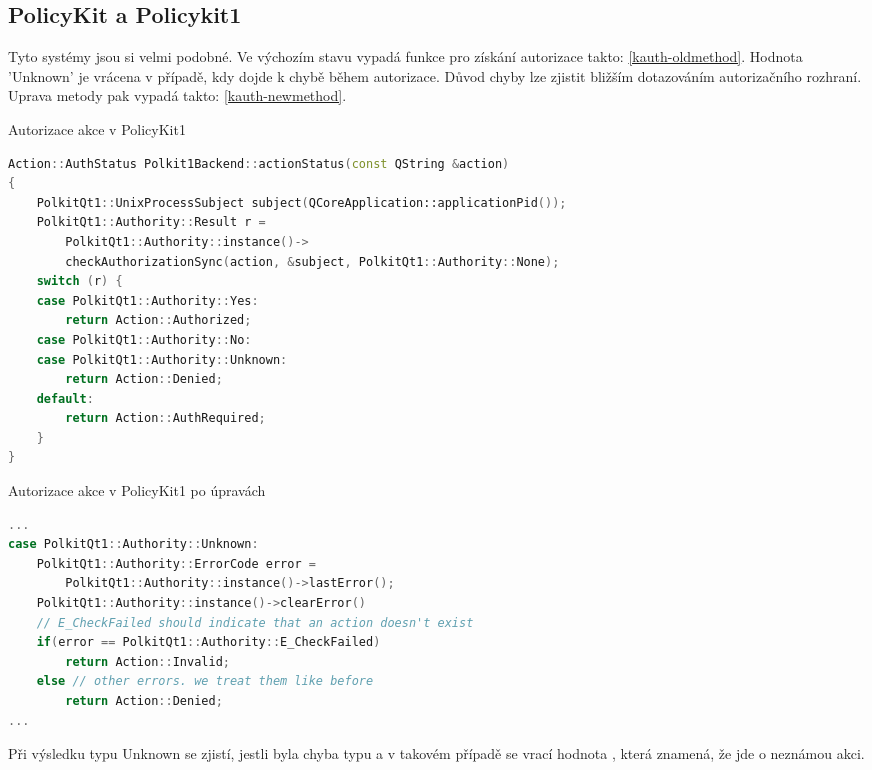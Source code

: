 {\subsection{PolicyKit a Policykit1}
Tyto systémy jsou si velmi podobné. Ve výchozím stavu vypadá funkce pro získání autorizace takto: \ref{kauth-oldmethod}. Hodnota 'Unknown' je vrácena v případě, kdy dojde k chybě během autorizace. Důvod chyby lze zjistit bližším dotazováním autorizačního rozhraní. Uprava metody pak vypadá takto: \ref{kauth-newmethod}.
\begin{mylisting}
\caption{Autorizace akce v PolicyKit1}
\label{kauth-oldmethod}
\begin{lstlisting}[language=C++]
Action::AuthStatus Polkit1Backend::actionStatus(const QString &action)
{
    PolkitQt1::UnixProcessSubject subject(QCoreApplication::applicationPid());
    PolkitQt1::Authority::Result r =
        PolkitQt1::Authority::instance()->
        checkAuthorizationSync(action, &subject, PolkitQt1::Authority::None);
    switch (r) {
    case PolkitQt1::Authority::Yes:
        return Action::Authorized;
    case PolkitQt1::Authority::No:
    case PolkitQt1::Authority::Unknown:
        return Action::Denied;
    default:
        return Action::AuthRequired;
    }
}
\end{lstlisting}
\end{mylisting}
\begin{mylisting}
\caption{Autorizace akce v PolicyKit1 po úpravách}
\label{kauth-newmethod}
\begin{lstlisting}[language=C++]
...
case PolkitQt1::Authority::Unknown:
    PolkitQt1::Authority::ErrorCode error =
        PolkitQt1::Authority::instance()->lastError();
    PolkitQt1::Authority::instance()->clearError()
    // E_CheckFailed should indicate that an action doesn't exist
    if(error == PolkitQt1::Authority::E_CheckFailed)
        return Action::Invalid;
    else // other errors. we treat them like before
        return Action::Denied;
...
\end{lstlisting}
\end{mylisting}
Při výsledku typu Unknown se zjistí, jestli byla chyba typu  a v takovém případě se vrací hodnota , která znamená, že jde o neznámou akci.
}
